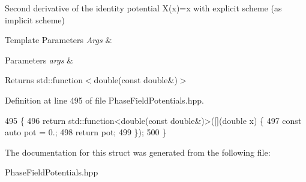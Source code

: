 Second derivative of the identity potential X(x)=x with explicit scheme (as implicit scheme) 


\begin{DoxyTemplParams}{Template Parameters}
{\em Args} & \\
\hline
\end{DoxyTemplParams}

\begin{DoxyParams}{Parameters}
{\em args} & \\
\hline
\end{DoxyParams}
\begin{DoxyReturn}{Returns}
std\+::function$<$double(const double\&)$>$ 
\end{DoxyReturn}


Definition at line 495 of file Phase\+Field\+Potentials.\+hpp.


\begin{DoxyCode}
495                                                         \{
496     \textcolor{keywordflow}{return} std::function<double(const double&)>([](\textcolor{keywordtype}{double} x) \{
497       \textcolor{keyword}{const} \textcolor{keyword}{auto} pot = 0.;
498       \textcolor{keywordflow}{return} pot;
499     \});
500   \}
\end{DoxyCode}


The documentation for this struct was generated from the following file\+:\begin{DoxyCompactItemize}
\item 
Phase\+Field\+Potentials.\+hpp\end{DoxyCompactItemize}
